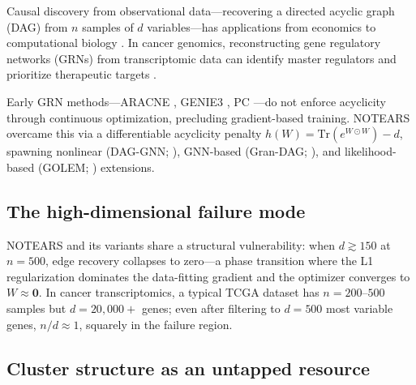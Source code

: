 \documentclass[12pt,a4paper]{article}
\begin{document}
Causal discovery from observational data---recovering a directed acyclic graph (DAG) from $n$ samples of $d$ variables---has applications from economics \cite{Spirtes2000} to computational biology \cite{Sachs2005}. In cancer genomics, reconstructing gene regulatory networks (GRNs) from transcriptomic data can identify master regulators and prioritize therapeutic targets \cite{Carro2010}.









Early GRN methods---ARACNE \cite{Margolin2006}, GENIE3 \cite{HuynhThu2010}, PC \cite{Spirtes2000}---do not enforce acyclicity through continuous optimization, precluding gradient-based training. NOTEARS \cite{Zheng2018} overcame this via a differentiable acyclicity penalty $h(W) = \text{Tr}(e^{W \odot W}) - d$, spawning nonlinear (DAG-GNN; \cite{Yu2019}), GNN-based (Gran-DAG; \cite{Lachapelle2020}), and likelihood-based (GOLEM; \cite{Ng2020}) extensions.









\subsection{The high-dimensional failure mode}









NOTEARS and its variants share a structural vulnerability: when $d \gtrsim 150$ at $n=500$, edge recovery collapses to zero---a phase transition where the L1 regularization dominates the data-fitting gradient and the optimizer converges to $W \approx \mathbf{0}$. In cancer transcriptomics, a typical TCGA dataset has $n = 200$--$500$ samples but $d = 20,000+$ genes; even after filtering to $d=500$ most variable genes, $n/d \approx 1$, squarely in the failure region.









\subsection{Cluster structure as an untapped resource}
\end{document}
